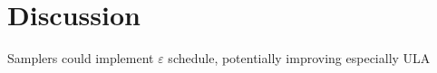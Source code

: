 
\section{Discussion}

Samplers could implement $\varepsilon$ schedule, potentially improving especially ULA